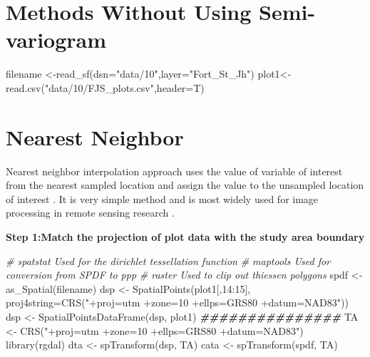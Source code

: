 \documentclass[
]{book}
\newenvironment{Shaded}{\begin{snugshade}}{\end{snugshade}}
\newcommand{\AttributeTok}[1]{\textcolor[rgb]{0.77,0.63,0.00}{#1}}
\newcommand{\CommentTok}[1]{\textcolor[rgb]{0.56,0.35,0.01}{\textit{#1}}}
\newcommand{\DecValTok}[1]{\textcolor[rgb]{0.00,0.00,0.81}{#1}}
\newcommand{\DocumentationTok}[1]{\textcolor[rgb]{0.56,0.35,0.01}{\textbf{\textit{#1}}}}
\newcommand{\FunctionTok}[1]{\textcolor[rgb]{0.00,0.00,0.00}{#1}}
\newcommand{\NormalTok}[1]{#1}
\newcommand{\OtherTok}[1]{\textcolor[rgb]{0.56,0.35,0.01}{#1}}
\newcommand{\SpecialCharTok}[1]{\textcolor[rgb]{0.00,0.00,0.00}{#1}}
\newcommand{\StringTok}[1]{\textcolor[rgb]{0.31,0.60,0.02}{#1}}
\begin{document}
\hypertarget{methods-without-using-semi-variogram}{%
\section{Methods Without Using Semi-variogram}\label{methods-without-using-semi-variogram}}

\begin{Shaded}
\begin{Highlighting}[]
\NormalTok{filename }\OtherTok{\textless{}{-}}\FunctionTok{read\_sf}\NormalTok{(}\AttributeTok{dsn=}\StringTok{"data/10"}\NormalTok{,}\AttributeTok{layer=}\StringTok{"Fort\_St\_Jh"}\NormalTok{)}
\NormalTok{plot1}\OtherTok{\textless{}{-}} \FunctionTok{read.csv}\NormalTok{(}\StringTok{"data/10/FJS\_plots.csv"}\NormalTok{,}\AttributeTok{header=}\NormalTok{T)}
\end{Highlighting}
\end{Shaded}

\hypertarget{nearest-neighbor}{%
\section{Nearest Neighbor}\label{nearest-neighbor}}

Nearest neighbor interpolation approach uses the value of variable of interest from the nearest sampled location and assign the value to the unsampled location of interest \citep{Titus2013}. It is very simple method and is most widely used for image processing in remote sensing research \citep{Titus2013}.

\textbf{Step 1:Match the projection of plot data with the study area boundary}

\begin{Shaded}
\begin{Highlighting}[]
\CommentTok{\# spatstat Used for the dirichlet tessellation function}
\CommentTok{\# maptools Used for conversion from SPDF to ppp}
\CommentTok{\# raster Used to clip out thiessen polygons}
\NormalTok{spdf }\OtherTok{\textless{}{-}} \FunctionTok{as\_Spatial}\NormalTok{(filename)}
\NormalTok{dsp }\OtherTok{\textless{}{-}} \FunctionTok{SpatialPoints}\NormalTok{(plot1[,}\DecValTok{14}\SpecialCharTok{:}\DecValTok{15}\NormalTok{], }\AttributeTok{proj4string=}\FunctionTok{CRS}\NormalTok{(}\StringTok{"+proj=utm +zone=10 +ellps=GRS80 +datum=NAD83"}\NormalTok{))}
\NormalTok{dsp }\OtherTok{\textless{}{-}} \FunctionTok{SpatialPointsDataFrame}\NormalTok{(dsp, plot1)}
\DocumentationTok{\#\#\#\#\#\#\#\#\#\#\#\#\#\#\#}
\NormalTok{TA }\OtherTok{\textless{}{-}} \FunctionTok{CRS}\NormalTok{(}\StringTok{"+proj=utm +zone=10 +ellps=GRS80 +datum=NAD83"}\NormalTok{)}
\FunctionTok{library}\NormalTok{(rgdal)}
\NormalTok{dta }\OtherTok{\textless{}{-}} \FunctionTok{spTransform}\NormalTok{(dsp, TA)}
\NormalTok{cata }\OtherTok{\textless{}{-}} \FunctionTok{spTransform}\NormalTok{(spdf, TA)}
\end{Highlighting}
\end{Shaded}
\end{document}

